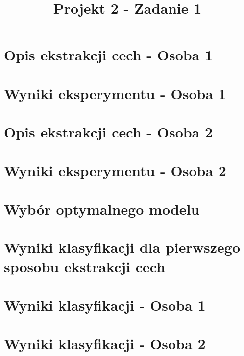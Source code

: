 \documentclass[12pt]{article}
\title{Projekt 2 - Zadanie 1}
\begin{document}
\maketitle
    \section{Opis ekstrakcji cech - Osoba 1}
    \pagebreak

    \section{Wyniki eksperymentu - Osoba 1}
    \pagebreak

    \section{Opis ekstrakcji cech - Osoba 2}
    \pagebreak

    \section{Wyniki eksperymentu - Osoba 2}
    \pagebreak

    \section{Wybór optymalnego modelu}
    \pagebreak

    \section{Wyniki klasyfikacji dla pierwszego sposobu ekstrakcji cech}
    \pagebreak

    \section{Wyniki klasyfikacji - Osoba 1}
    \pagebreak

    \section{Wyniki klasyfikacji - Osoba 2}
    \pagebreak

    \section{}
    \pagebreak
\end{document}
